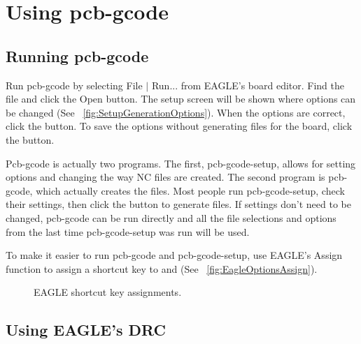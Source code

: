 \documentclass[11pt]{book}
\begin{document}
%
\chapter{Using pcb-gcode}
%

%
%
\section{Running pcb-gcode}\label{sec:running}

Run pcb-gcode by selecting File $|$ Run... from EAGLE's board editor. Find the file  and click the Open button. The setup screen will be shown where options can be changed (See \figurename~\ref{fig:SetupGenerationOptions}). When the options are correct, click the  button. To save the options without generating files for the board, click the  button.

Pcb-gcode is actually two programs. The first, pcb-gcode-setup, allows for setting options and changing the way NC files are created. The second program is pcb-gcode, which actually creates the files. Most people run pcb-gcode-setup, check their settings, then click the  button to generate files. If settings don't need to be changed, pcb-gcode can be run directly and all the file selections and options from the last time pcb-gcode-setup was run will be used.

To make it easier to run pcb-gcode and pcb-gcode-setup, use EAGLE's Assign function to assign a shortcut key to  and  (See \figurename~\vref{fig:EagleOptionsAssign}).

\begin{figure}
	\caption{EAGLE shortcut key assignments.}
	\label{fig:EagleOptionsAssign}
\end{figure}

%
%
\section{Using EAGLE's DRC}\label{sec:EagleDRC}
\end{document}
